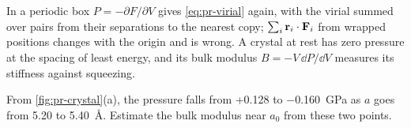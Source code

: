 \begin{keyidea}
In a periodic box $P = -\partial F/\partial V$ gives \cref{eq:pr-virial}
again, with the virial summed over pairs from their separations to the
nearest copy; $\sum_i\bm{\mathrm{r}}_i\cdot\bm{\mathrm{F}}_i$ from wrapped positions
changes with the origin and is wrong. A crystal at rest has zero
pressure at the spacing of least energy, and its bulk modulus $B =
-V\,\dd P/\dd V$ measures its stiffness against squeezing.
\end{keyidea}


\begin{selfcheck}
From \cref{fig:pr-crystal}(a), the pressure falls from +0.128 to
\SI{-0.160}{\giga\pascal} as $a$ goes from 5.20 to \SI{5.40}{\angstrom}.
Estimate the bulk modulus near $a_0$ from these two points.
\end{selfcheck}
